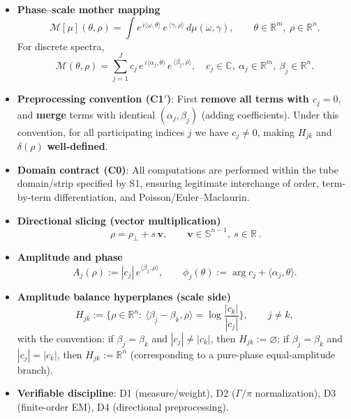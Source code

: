 \documentclass[11pt,a4paper]{article}
\theoremstyle{remark}
\begin{document}
\begin{itemize}
\item \textbf{Phase--scale mother mapping}
\begin{equation}
\mathcal{M}[\mu](\theta,\rho)
=\int e^{\,i\langle\omega,\theta\rangle}\,e^{\,\langle\gamma,\rho\rangle}\,d\mu(\omega,\gamma),
\qquad \theta\in\mathbb{R}^{m},\ \rho\in\mathbb{R}^{n}.
\end{equation}
For discrete spectra,
\begin{equation}
\mathcal{M}(\theta,\rho)
=\sum_{j=1}^J c_j\,e^{\,i\langle\alpha_j,\theta\rangle}\,e^{\,\langle\beta_j,\rho\rangle},
\quad
c_j\in\mathbb{C},\ \alpha_j\in\mathbb{R}^m,\ \beta_j\in\mathbb{R}^n.
\end{equation}

\item \textbf{Preprocessing convention (C1$'$)}: First \textbf{remove all terms with $c_j=0$}, and \textbf{merge} terms with identical $(\alpha_j,\beta_j)$ (adding coefficients). Under this convention, for all participating indices $j$ we have $c_j\neq0$, making $H_{jk}$ and $\delta(\rho)$ \textbf{well-defined}.

\item \textbf{Domain contract (C0)}: All computations are performed within the tube domain/strip specified by S1, ensuring legitimate interchange of order, term-by-term differentiation, and Poisson/Euler--Maclaurin.

\item \textbf{Directional slicing (vector multiplication)}
\begin{equation}
\boxed{\ \rho=\rho_\perp+s\,\mathbf{v},\qquad \mathbf{v}\in\mathbb{S}^{n-1},\ s\in\mathbb{R}\ }.
\end{equation}

\item \textbf{Amplitude and phase}
\begin{equation}
A_j(\rho):=|c_j|\,e^{\langle\beta_j,\rho\rangle},\qquad
\phi_j(\theta):=\arg c_j+\langle\alpha_j,\theta\rangle.
\end{equation}

\item \textbf{Amplitude balance hyperplanes (scale side)}
\begin{equation}
H_{jk}:=\Big\{\rho\in\mathbb{R}^n:\ \langle\beta_j-\beta_k,\rho\rangle=\log\frac{|c_k|}{|c_j|}\Big\},\qquad j\ne k,
\end{equation}
with the convention: if $\beta_j=\beta_k$ and $|c_j|\ne|c_k|$, then $H_{jk}:=\varnothing$; if $\beta_j=\beta_k$ and $|c_j|=|c_k|$, then $H_{jk}:=\mathbb{R}^n$ (corresponding to a pure-phase equal-amplitude branch).

\item \textbf{Verifiable discipline}: D1 (measure/weight), D2 ($\Gamma/\pi$ normalization), D3 (finite-order EM), D4 (directional preprocessing).
\end{itemize}
\end{document}
